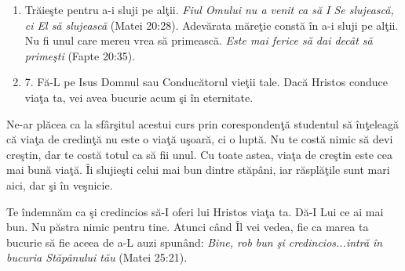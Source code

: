 \begin{enumerate}
       \item Trăieşte pentru a-i sluji pe alţii. \textit{Fiul Omului nu a venit ca să I Se slujească, ci El să slujească} (Matei 20:28). Adevărata măreţie constă în a-i sluji pe alţii. Nu fi unul care mereu vrea să primească. \textit{Este mai ferice să dai decât să primeşti} (Fapte 20:35). 
       
       \item 7.	Fă-L pe Isus Domnul sau Conducătorul vieţii tale. Dacă Hristos conduce viaţa ta, vei avea bucurie acum şi în eternitate. 
       
    \end{enumerate}
    
Ne-ar plăcea ca la sfârşitul acestui curs prin corespondenţă studentul să înţeleagă că viaţa de credinţă nu este o viaţă uşoară, ci o luptă. Nu te costă nimic să devi creştin, dar te costă totul ca să fii unul. Cu toate astea, viaţa de creştin este cea mai bună viaţă. Îi slujieşti celui mai bun dintre stăpâni, iar răsplăţile sunt mari aici, dar şi în veşnicie.

Te îndemnăm ca şi credincios să-I oferi lui Hristos viaţa ta. Dă-I Lui ce ai mai bun. Nu păstra nimic pentru tine. Atunci când Îl vei vedea, fie ca marea ta bucurie să fie aceea de a-L auzi spunând: \textit{Bine, rob bun şi credincios...intră în bucuria Stăpânului tău} (Matei 25:21).
